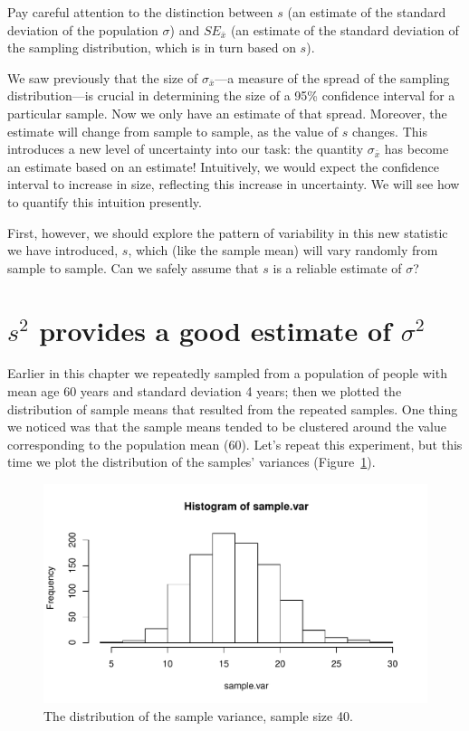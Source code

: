 \documentclass[12pt]{book}\usepackage[]{graphicx}\usepackage[]{color}
\makeatletter
\def\maxwidth{ %
  \ifdim\Gin@nat@width>\linewidth
    \linewidth
  \else
    \Gin@nat@width
  \fi
}
\newenvironment{knitrout}{}{} %
\makeatother
\begin{document}
Pay careful attention to the distinction between $s$ (an estimate of the standard deviation of the population
$\sigma$) and $SE_{\bar{x}}$ (an estimate of the standard deviation of the sampling distribution, which is in turn based on $s$).  

We saw previously that the size of $\sigma_{\bar{x}}$---a measure of the spread of the sampling distribution---is crucial in determining the size of a 95\% confidence interval for a particular sample. Now we only have an estimate of that spread. Moreover, the estimate will change from sample to sample, as the value of $s$ changes. This introduces a new level of uncertainty into our task: the quantity $\sigma_{\bar{x}}$ has become an estimate based on an estimate! Intuitively, we would expect the confidence interval to increase in size, reflecting this increase in uncertainty. We will see how to quantify this intuition presently.

First, however, we should explore the pattern of variability in this new statistic we have introduced, $s$, which (like the sample mean) will vary randomly from sample to sample. Can we safely assume
that $s$ is a reliable estimate of $\sigma$? 

\section{$s^2$ provides a good estimate of $\sigma^2$}

Earlier in this chapter we repeatedly sampled from a population of
people with mean age 60 years and standard deviation 4 years; then we plotted the
distribution of sample means that resulted from the repeated samples.
One thing we noticed was that the sample means tended to be clustered around the value corresponding to the population mean (60).
Let's repeat this experiment, but this time we plot the distribution
of the samples' variances 
(Figure~\ref{fig:varsample}). 





\begin{figure}[!htbp]
  \centering
\begin{knitrout}
\color{fgcolor}
\includegraphics[width=\maxwidth]{figure/unnamed-chunk-26-1} 

\end{knitrout}
  \caption{The distribution of the sample variance,
    sample size 40.}
  \label{fig:varsample}
\end{figure}
\end{document}
